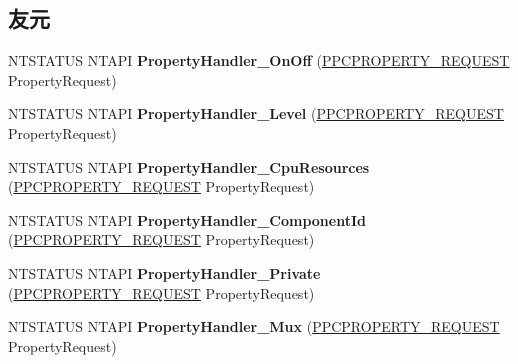 \subsection*{友元}
\begin{DoxyCompactItemize}
\item 
\mbox{\label{class_c_c_m_i_topology_ae4ac71b8be69e326201de3871bcc67fa}} 
N\+T\+S\+T\+A\+T\+US N\+T\+A\+PI {\bfseries Property\+Handler\+\_\+\+On\+Off} (\hyperlink{struct___p_c_p_r_o_p_e_r_t_y___r_e_q_u_e_s_t}{P\+P\+C\+P\+R\+O\+P\+E\+R\+T\+Y\+\_\+\+R\+E\+Q\+U\+E\+ST} Property\+Request)
\item 
\mbox{\label{class_c_c_m_i_topology_af25e303874da47ad2587436de1e48e83}} 
N\+T\+S\+T\+A\+T\+US N\+T\+A\+PI {\bfseries Property\+Handler\+\_\+\+Level} (\hyperlink{struct___p_c_p_r_o_p_e_r_t_y___r_e_q_u_e_s_t}{P\+P\+C\+P\+R\+O\+P\+E\+R\+T\+Y\+\_\+\+R\+E\+Q\+U\+E\+ST} Property\+Request)
\item 
\mbox{\label{class_c_c_m_i_topology_ad217bf81810ecdbf7da1ddfcc120dd07}} 
N\+T\+S\+T\+A\+T\+US N\+T\+A\+PI {\bfseries Property\+Handler\+\_\+\+Cpu\+Resources} (\hyperlink{struct___p_c_p_r_o_p_e_r_t_y___r_e_q_u_e_s_t}{P\+P\+C\+P\+R\+O\+P\+E\+R\+T\+Y\+\_\+\+R\+E\+Q\+U\+E\+ST} Property\+Request)
\item 
\mbox{\label{class_c_c_m_i_topology_a41219af5ed5dc118de91d21164fc145d}} 
N\+T\+S\+T\+A\+T\+US N\+T\+A\+PI {\bfseries Property\+Handler\+\_\+\+Component\+Id} (\hyperlink{struct___p_c_p_r_o_p_e_r_t_y___r_e_q_u_e_s_t}{P\+P\+C\+P\+R\+O\+P\+E\+R\+T\+Y\+\_\+\+R\+E\+Q\+U\+E\+ST} Property\+Request)
\item 
\mbox{\label{class_c_c_m_i_topology_aa0c51ee7b40711d0f5bac6984a51c9a6}} 
N\+T\+S\+T\+A\+T\+US N\+T\+A\+PI {\bfseries Property\+Handler\+\_\+\+Private} (\hyperlink{struct___p_c_p_r_o_p_e_r_t_y___r_e_q_u_e_s_t}{P\+P\+C\+P\+R\+O\+P\+E\+R\+T\+Y\+\_\+\+R\+E\+Q\+U\+E\+ST} Property\+Request)
\item 
\mbox{\label{class_c_c_m_i_topology_acceaf0908da1d51fbe6f17a6dcc176f7}} 
N\+T\+S\+T\+A\+T\+US N\+T\+A\+PI {\bfseries Property\+Handler\+\_\+\+Mux} (\hyperlink{struct___p_c_p_r_o_p_e_r_t_y___r_e_q_u_e_s_t}{P\+P\+C\+P\+R\+O\+P\+E\+R\+T\+Y\+\_\+\+R\+E\+Q\+U\+E\+ST} Property\+Request)
\end{DoxyCompactItemize}


